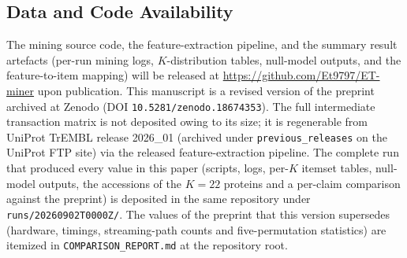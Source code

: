\documentclass[10pt,a4paper,twocolumn]{article}
\begin{document}
\subsection*{Data and Code Availability}
\small
\noindent The mining source code, the feature-extraction pipeline, and the summary result artefacts (per-run mining logs, $K$-distribution tables, null-model outputs, and the feature-to-item mapping) will be released at \url{https://github.com/Et9797/ET-miner} upon publication. This manuscript is a revised version of the preprint archived at Zenodo (DOI \texttt{10.5281/zenodo.18674353}). The full intermediate transaction matrix is not deposited owing to its size; it is regenerable from UniProt TrEMBL release 2026\_01 (archived under \texttt{previous\_releases} on the UniProt FTP site) via the released feature-extraction pipeline. The complete run that produced every value in this paper (scripts, logs, per-$K$ itemset tables, null-model outputs, the accessions of the $K{=}22$ proteins and a per-claim comparison against the preprint) is deposited in the same repository under \texttt{runs/20260902T0000Z/}. The values of the preprint that this version supersedes (hardware, timings, streaming-path counts and five-permutation statistics) are itemized in \texttt{COMPARISON\_REPORT.md} at the repository root.
\normalsize

\end{document}

